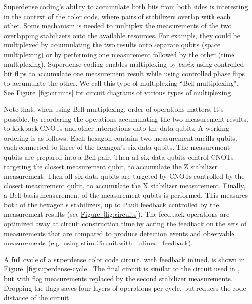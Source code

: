 \documentclass[onecolumn,unpublished,a4paper]{quantumarticle}
\theoremstyle{definition}
\theoremstyle{definition}
\theoremstyle{definition}
\newcommand{\fig}[1]{\hyperref[fig:#1]{Figure~\ref*{fig:#1}}}
\begin{document}
Superdense coding's ability to accumulate both bits from both sides is interesting in the context of the color code, where pairs of stabilizers overlap with each other.
Some mechanism is needed to multiplex the measurements of the two overlapping stabilizers onto the available resources.
For example, they could be multiplexed by accumulating the two results onto separate qubits (space multiplexing) or by performing one measurement followed by the other (time multiplexing).
Superdense coding enables multiplexing by \emph{basis}: using controlled bit flips to accumulate one measurement result while using controlled phase flips to accumulate the other.
We call this type of multiplexing ``Bell multiplexing".
See \fig{circuits} for circuit diagrams of various types of multiplexing.

Note that, when using Bell multiplexing, order of operations matters.
It's possible, by reordering the operations accumulating the two measurement results, to kickback CNOTs and other interactions onto the data qubits.
A working ordering is as follows.
Each hexagon contains two measurement ancilla qubits, each connected to three of the hexagon's six data qubits.
The measurement qubits are prepared into a Bell pair.
Then all six data qubits control CNOTs targeting the closest measurement qubit, to accumulate the Z stabilizer measurement.
Then all six data qubits are targeted by CNOTs controlled by the closest measurement qubit, to accumulate the X stabilizer measurement.
Finally, a Bell basis measurement of the measurement qubits is performed.
This measures both of the hexagon's stabilizers, up to Pauli feedback controlled by the measurement results (see \fig{circuits}).
The feedback operations are optimized away at circuit construction time by acting the feedback on the sets of measurements that are compared to produce detection events and observable measurements (e.g. using \href{https://github.com/quantumlib/Stim/blob/main/doc/python_api_reference_vDev.md#stim.Circuit.with_inlined_feedback}{stim.Circuit.with\_inlined\_feedback}).

A full cycle of a superdense color code circuit, with feedback inlined, is shown in \fig{superdense-cycle}.
The final circuit is similar to the circuit used in \cite{baireuther2019nncolorcode}, but with flag measurements replaced by the second stabilizer measurements.
Dropping the flags saves four layers of operations per cycle, but reduces the code distance of the circuit.
\end{document}
